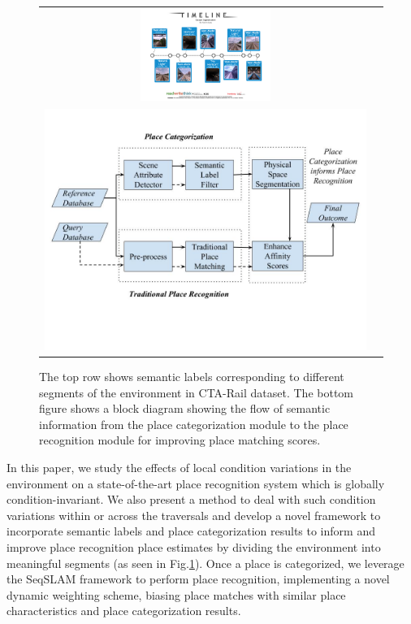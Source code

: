 \documentclass[letterpaper, 10 pt, conference]{ieeeconf}  %
\begin{document}
\begin{figure}
\centering
\begin{tabular}{cc}
	\includegraphics[clip, trim=2cm 4cm 2cm 4cm,width=6.5cm,height=3.0cm]{cta-dataset-segmentation-1}\\
	
	\includegraphics[clip, trim=0cm 4cm 0cm 2cm,scale=0.2]{flowchart}
\end{tabular}
	\caption{ The top row shows semantic labels corresponding to different segments of the environment in CTA-Rail dataset. The bottom figure shows a block diagram showing the flow of semantic information from the place categorization module to the place recognition module for improving place matching scores.}
	\label{fig:flowchart}
\end{figure}


In this paper, we study the effects of local condition variations in the environment on a state-of-the-art place recognition system which is globally condition-invariant. We also present a method to deal with such condition variations within or across the traversals and develop a novel framework to incorporate semantic labels and place categorization results to inform and improve place recognition place estimates by dividing the environment into meaningful segments (as seen in Fig.\ref{fig:flowchart}). Once a place is categorized, we leverage the SeqSLAM \cite{Milford2012} framework to perform place recognition, implementing a novel dynamic weighting scheme, biasing place matches with similar place characteristics and place categorization results. 
\end{document}

